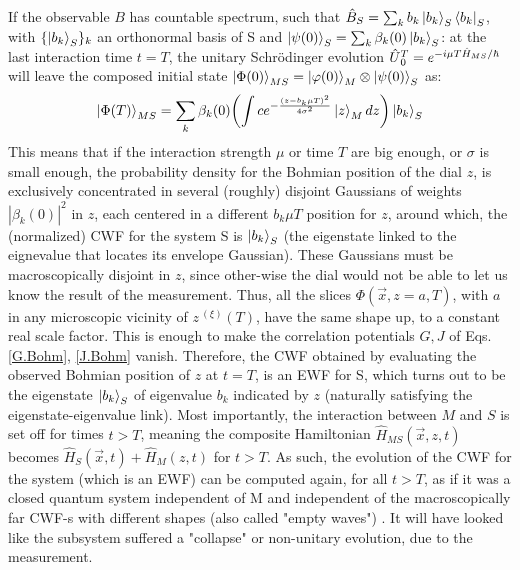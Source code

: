 \documentclass[11pt, a4paper]{article} %
\begin{document}
If the observable $B$ has countable spectrum, such that $\hat{B}_S=\sum_k b_k \ket{b_k}_S\bra{b_k}_S$, with $\{\ket{b_k}_S\}_k$ an orthonormal basis of S and $\ket{\psi(0)}_S=\sum_k \beta_k(0)\ket{b_k}_S$: at the last interaction time $t=T$, the unitary Schrödinger evolution $\hat{U} \null_{0}^T=e^{-i\mu T \hat{H}_{MS}/\hbar}$ will leave the composed initial state $\ket{\Phi(0)}_{MS}=\ket{\varphi(0)}_M\otimes\ket{\psi(0)}_S$ as:\vspace{-0.15cm}
\begin{equation}\label{postM1}
\ket{\Phi(T)}_{MS}=\sum_k \beta_k(0)\qty(\int c e^{-\frac{(z-b_k\mu T)^2}{4\sigma^2}}\ket{z}_M dz )\ket{b_k}_S
\end{equation}
This means that if the interaction strength $\mu$ or time $T$ are big enough, or $\sigma$ is small enough, the probability density for the Bohmian position of the dial $z$, is exclusively concentrated in several (roughly) disjoint Gaussians of weights $|\beta_k(0)|^2$ in $z$, each centered in a different $b_k \mu T$ position for $z$, around which, the (normalized) CWF for the system S is $\ket{b_k}_S$ (the eigenstate linked to the eignevalue that locates its envelope Gaussian). These Gaussians must be macroscopically disjoint in $z$, since other-wise the dial would not be able to let us know the result of the measurement. Thus, all the slices $\Phi(\vec{x},z=a,T)$, with $a$ in any microscopic vicinity of $z^{\: (\xi)}(T)$, have the same shape up, to a constant real scale factor. This is enough to make the correlation potentials $G,J$ of Eqs. \eqref{G.Bohm}, \eqref{J.Bohm} vanish. Therefore, the CWF obtained by evaluating the observed Bohmian position of $z$ at $t=T$, is an EWF for S, which turns out to be the eigenstate $\ket{b_k}_S$ of eigenvalue $b_k$ indicated by $z$ (naturally satisfying the eigenstate-eigenvalue link). Most importantly, the interaction between $M$ and $S$ is set off for times $t>T$, meaning the composite Hamiltonian $\hat{H}_{MS}(\vec{x},z,t)$ becomes $\hat{H}_S(\vec{x},t)+\hat{H}_M(z,t)$ for $t>T$. As such, the evolution of the CWF for the system (which is an EWF) can be computed again, for all $t>T$, as if it was a closed quantum system independent of M and independent of the macroscopically far CWF-s with different shapes (also called "empty waves") \cite{JordiXavier}. It will have looked like the subsystem suffered a "collapse" or non-unitary evolution, due to the measurement.

\end{document}

